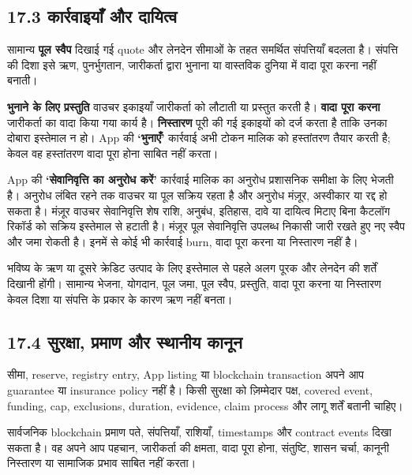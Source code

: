 \documentclass[11pt]{article}
\begin{document}
\subsection*{17.3 कार्रवाइयाँ और दायित्व}

सामान्य \textbf{पूल स्वैप} दिखाई गई quote और लेनदेन सीमाओं के तहत समर्थित संपत्तियाँ बदलता है। संपत्ति की दिशा इसे ऋण, पुनर्भुगतान, जारीकर्ता द्वारा भुनाना या वास्तविक दुनिया में वादा पूरा करना नहीं बनाती।

\textbf{भुनाने के लिए प्रस्तुति} वाउचर इकाइयाँ जारीकर्ता को लौटाती या प्रस्तुत करती है। \textbf{वादा पूरा करना} जारीकर्ता का वादा किया गया कार्य है। \textbf{निस्तारण} पूरी की गई इकाइयों को दर्ज करता है ताकि उनका दोबारा इस्तेमाल न हो। App की \textbf{`भुनाएँ'} कार्रवाई अभी टोकन मालिक को हस्तांतरण तैयार करती है; केवल वह हस्तांतरण वादा पूरा होना साबित नहीं करता।

App की \textbf{`सेवानिवृत्ति का अनुरोध करें'} कार्रवाई मालिक का अनुरोध प्रशासनिक समीक्षा के लिए भेजती है। अनुरोध लंबित रहने तक वाउचर या पूल सक्रिय रहता है और अनुरोध मंज़ूर, अस्वीकार या रद्द हो सकता है। मंज़ूर वाउचर सेवानिवृत्ति शेष राशि, अनुबंध, इतिहास, दावे या दायित्व मिटाए बिना कैटलॉग रिकॉर्ड को सक्रिय इस्तेमाल से हटाती है। मंज़ूर पूल सेवानिवृत्ति उपलब्ध निकासी जारी रखते हुए नए स्वैप और जमा रोकती है। इनमें से कोई भी कार्रवाई burn, वादा पूरा करना या निस्तारण नहीं है।

भविष्य के ऋण या दूसरे क्रेडिट उत्पाद के लिए इस्तेमाल से पहले अलग पूरक और लेनदेन की शर्तें दिखानी होंगी। सामान्य भेजना, योगदान, पूल जमा, पूल स्वैप, प्रस्तुति, वादा पूरा करना या निस्तारण केवल दिशा या संपत्ति के प्रकार के कारण ऋण नहीं बनता।

\subsection*{17.4 सुरक्षा, प्रमाण और स्थानीय कानून}

सीमा, reserve, registry entry, App listing या blockchain transaction अपने आप guarantee या insurance policy नहीं है। किसी सुरक्षा को ज़िम्मेदार पक्ष, covered event, funding, cap, exclusions, duration, evidence, claim process और लागू शर्तें बतानी चाहिए।

सार्वजनिक blockchain प्रमाण पते, संपत्तियाँ, राशियाँ, timestamps और contract events दिखा सकता है। वह अपने आप पहचान, जारीकर्ता की क्षमता, वादा पूरा होना, संतुष्टि, शासन चर्चा, कानूनी निस्तारण या सामाजिक प्रभाव साबित नहीं करता।
\end{document}
